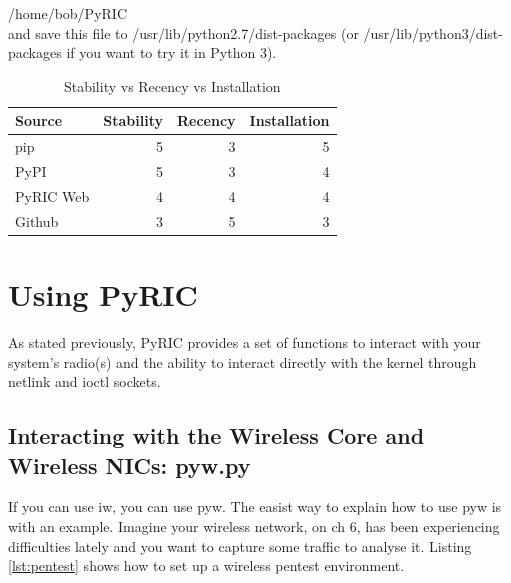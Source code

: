 \documentclass[11pt]{article}
\begin{document}
    /home/bob/PyRIC \\

and save this file to /usr/lib/python2.7/dist-packages (or 
/usr/lib/python3/dist-packages if you want to try it in Python 3).

\begin{table}
\begin{center}
\begin{tabular}{| l | r | r | r |}
\hline
Source & Stability & Recency & Installation \\
\hline
pip & 5 & 3 & 5\\
\hline
PyPI & 5 & 3 & 4\\
\hline
PyRIC Web & 4 & 4 & 4\\
\hline
Github & 3 & 5 & 3\\
\hline
\end{tabular}
\caption{Stability vs Recency vs Installation}
\end{center}
\label{tab:install}
\end{table}

\section{Using PyRIC}\label{sec:using}
As stated previously, PyRIC provides a set of functions to interact with your 
system's radio(s) and the ability to interact directly with the kernel through
netlink and ioctl sockets.

\subsection{Interacting with the Wireless Core and Wireless NICs: pyw.py}
If you can use iw, you can use pyw. The easist way to explain how to use pyw is 
with an example. Imagine your wireless network, on ch 6, has been experiencing 
difficulties lately and you want to capture some traffic to analyse it. Listing 
\ref{lst:pentest} shows how to set up a wireless pentest environment. \\
\end{document}
